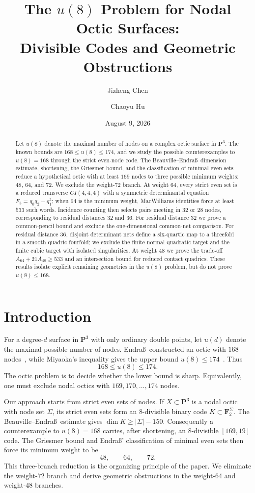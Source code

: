 \documentclass[11pt,reqno]{amsart}
\title[The $u(8)$ problem for nodal octics]{The $u(8)$ Problem for Nodal Octic Surfaces:\\Divisible Codes and Geometric Obstructions}
\author{Jizheng Chen}
\author{Chaoyu Hu}
\date{August 9, 2026}
\theoremstyle{remark}
\newcommand{\F}{\mathbf F}
\newcommand{\PP}{\mathbf P}
\begin{document}
\begin{abstract}
Let $u(8)$ denote the maximal number of nodes on a complex octic surface in $\PP^3$.  The known bounds are $168\le u(8)\le174$, and we study the possible counterexamples to $u(8)=168$ through the strict even-node code.  The Beauville--Endra\ss\ dimension estimate, shortening, the Griesmer bound, and the classification of minimal even sets reduce a hypothetical octic with at least $169$ nodes to three possible minimum weights: $48$, $64$, and $72$.  We exclude the weight-$72$ branch.  At weight $64$, every strict even set is a reduced transverse $CI(4,4,4)$ with a symmetric determinantal equation $F_8=q_0q_2-q_1^2$; when $64$ is the minimum weight, MacWilliams identities force at least $533$ such words.  Incidence counting then selects pairs meeting in $32$ or $28$ nodes, corresponding to residual distances $32$ and $36$.  For residual distance $32$ we prove a common-pencil bound and exclude the one-dimensional common-net comparison.  For residual distance $36$, disjoint determinant nets define a six-quartic map to a threefold in a smooth quadric fourfold; we exclude the finite normal quadratic target and the finite cubic target with isolated singularities.  At weight $48$ we prove the trade-off $A_{64}+21A_{48}\ge533$ and an intersection bound for reduced contact quadrics.  These results isolate explicit remaining geometries in the $u(8)$ problem, but do not prove $u(8)\le168$.
\end{abstract}

\maketitle

\section{Introduction}
For a degree-$d$ surface in $\PP^3$ with only ordinary double points, let $u(d)$ denote the maximal possible number of nodes.  Endra\ss\ constructed an octic with $168$ nodes~\cite{Endrass168}, while Miyaoka's inequality gives the upper bound $u(8)\le174$~\cite{Miyaoka}.  Thus
\[
168\le u(8)\le174.
\]
The octic problem is to decide whether the lower bound is sharp.  Equivalently, one must exclude nodal octics with $169,170,\ldots,174$ nodes.

Our approach starts from strict even sets of nodes.  If $X\subset\PP^3$ is a nodal octic with node set $\Sigma$, its strict even sets form an $8$-divisible binary code $K\subset\F_2^\Sigma$.  The Beauville--Endra\ss\ estimate gives $\dim K\ge |\Sigma|-150$.  Consequently a counterexample to $u(8)=168$ carries, after shortening, an $8$-divisible $[169,19]$ code.  The Griesmer bound and Endra\ss' classification of minimal even sets then force its minimum weight to be
\[
48,\qquad64,\qquad72.
\]
This three-branch reduction is the organizing principle of the paper.  We eliminate the weight-$72$ branch and derive geometric obstructions in the weight-$64$ and weight-$48$ branches.
\end{document}
